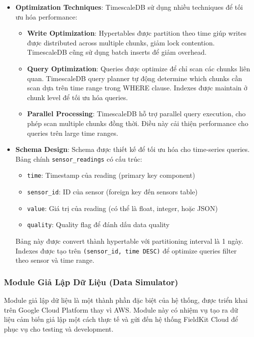 \begin{itemize}
    \item \textbf{Optimization Techniques}: TimescaleDB sử dụng nhiều techniques để tối ưu hóa performance:
        \begin{itemize}
            \item \textbf{Write Optimization}: Hypertables được partition theo time giúp writes được distributed across multiple chunks, giảm lock contention. TimescaleDB cũng sử dụng batch inserts để giảm overhead.
            
            \item \textbf{Query Optimization}: Queries được optimize để chỉ scan các chunks liên quan. TimescaleDB query planner tự động determine which chunks cần scan dựa trên time range trong WHERE clause. Indexes được maintain ở chunk level để tối ưu hóa queries.
            
            \item \textbf{Parallel Processing}: TimescaleDB hỗ trợ parallel query execution, cho phép scan multiple chunks đồng thời. Điều này cải thiện performance cho queries trên large time ranges.
        \end{itemize}
    
    \item \textbf{Schema Design}: Schema được thiết kế để tối ưu hóa cho time-series queries. Bảng chính \texttt{sensor\_readings} có cấu trúc:
        \begin{itemize}
            \item \texttt{time}: Timestamp của reading (primary key component)
            \item \texttt{sensor\_id}: ID của sensor (foreign key đến sensors table)
            \item \texttt{value}: Giá trị của reading (có thể là float, integer, hoặc JSON)
            \item \texttt{quality}: Quality flag để đánh dấu data quality
        \end{itemize}
        Bảng này được convert thành hypertable với partitioning interval là 1 ngày. Indexes được tạo trên \texttt{(sensor\_id, time DESC)} để optimize queries filter theo sensor và time range.
\end{itemize}

\subsubsection{Module Giả Lập Dữ Liệu (Data Simulator)}

Module giả lập dữ liệu là một thành phần đặc biệt của hệ thống, được triển khai trên Google Cloud Platform thay vì AWS. Module này có nhiệm vụ tạo ra dữ liệu cảm biến giả lập một cách thực tế và gửi đến hệ thống FieldKit Cloud để phục vụ cho testing và development.

